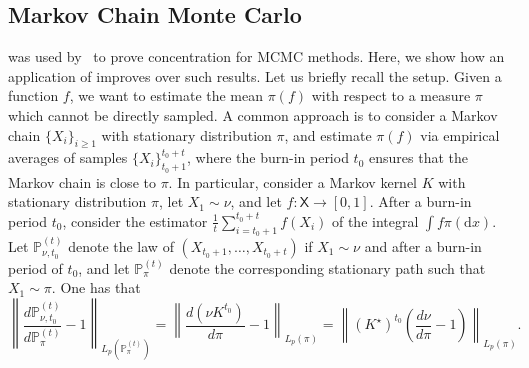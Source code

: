 \documentclass[11pt]{article}
\theoremstyle{plain}
\theoremstyle{remark}
\begin{document}
    \subsection{Markov Chain Monte Carlo}\label{sec:MCMC} was used by~\cite{dependentViaStatAndChange} to prove %
    concentration %
    for MCMC methods.
    Here, %
    we show how an application of  improves over such results.
   Let us briefly recall the setup. Given a function $f$, we want to estimate the mean $\pi(f)$ with respect to a measure $\pi$ which cannot be directly sampled. 
A common approach is to consider a Markov chain $\{X_i\}_{i\geq 1}$ with stationary distribution $\pi$, and estimate $\pi(f)$ via empirical averages of samples $\{X_i\}_{t_0+1}^{t_0+t}$, where the burn-in period $t_0$ ensures that the Markov chain is close to $\pi$.
    In particular, consider a Markov kernel $K$ with stationary distribution $\pi$, let $X_1 \sim \nu$, and let \(f:\mathsf X\to[0,1]\). After a burn-in
period \(t_0\), consider the estimator $\frac1t \sum_{i=t_0+1}^{t_0+t} f(X_i)$ of the integral $\int f\pi(\mathrm{d}x)$. Let \(\mathbb P_{\nu,t_0}^{(t)}\) denote the law of
\((X_{t_0+1},\ldots,X_{t_0+t})\) if $X_1\sim \nu$ and after a burn-in period of $t_0$, and let
\(\mathbb P_{\pi}^{(t)}\) denote the corresponding stationary path such that $X_1 \sim \pi$. One has that \[
    \left\|
    \frac{d\mathbb P_{\nu,t_0}^{(t)}}
         {d\mathbb P_{\pi}^{(t)}}-1
    \right\|_{L_p(\mathbb P_{\pi}^{(t)})}
    =  \left\|
    \frac{d(\nu K^{t_0})}
         {d\pi}-1
    \right\|_{L_p(\pi)} = 
    \left\|
    (K^\star)^{t_0}
    \left(\frac{d\nu}{d\pi}-1\right)
    \right\|_{L_p(\pi)}.
\]
\end{document}
